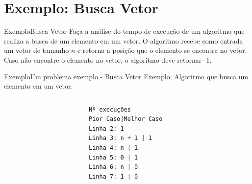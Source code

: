 \documentclass[aspectratio=169]{beamer}
\begin{document}
\section{Exemplo: Busca Vetor}

\begin{frame}{Exemplo}{Busca Vetor}
Faça a análise do tempo de execução de um algoritmo que realiza a busca de um elemento em um vetor. O algoritmo recebe como entrada um vetor de tamanho $n$ e retorna a posição que o elemento se encontra no vetor. Caso não encontre o elemento no vetor, o algoritmo deve retornar -1.
\end{frame}


\begin{frame}[fragile]{Exemplo}{Um problema exemplo - Busca Vetor}
Exemplo: Algoritmo que busca um elemento em um vetor.
\begin{columns}[T] %
\begin{column}{.68\textwidth}
\end{column}%
\hfill%
\begin{column}{.28\textwidth}
\begin{verbatim}
Nº execuções
Pior Caso|Melhor Caso
Linha 2: 1
Linha 3: n + 1 | 1       
Linha 4: n | 1
Linha 5: 0 | 1
Linha 6: n | 0      
Linha 7: 1 | 0
\end{verbatim}
\end{column}%
\end{columns}
\end{frame}

\end{document}
